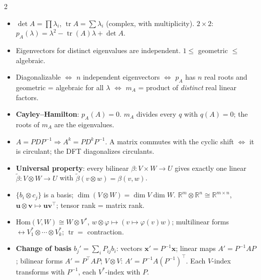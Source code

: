 \documentclass[10pt]{article}
\DeclareMathOperator{\tr}{tr}
\newcommand{\topic}[1]{\par\smallskip\noindent{\color{blue!50!black}\textbf{#1}}\par\nopagebreak}
\begin{document}
\begin{multicols}{2}
\topic{Eigenvalues}
\begin{itemize}
    \item $\det A = \prod\lambda_i$, $\tr A = \sum\lambda_i$ (complex, with multiplicity). $2 \times 2$: $p_A(\lambda) = \lambda^2 - \tr(A)\lambda + \det A$.
    \item Eigenvectors for distinct eigenvalues are independent. $1 \leq$ geometric $\leq$ algebraic.
    \item Diagonalizable $\iff$ $n$ independent eigenvectors $\iff$ $p_A$ has $n$ real roots and geometric = algebraic for all $\lambda$ $\iff$ $m_A$ = product of \emph{distinct} real linear factors.
    \item \textbf{Cayley--Hamilton}: $p_A(A) = 0$. $m_A$ divides every $q$ with $q(A) = 0$; the roots of $m_A$ are the eigenvalues.
    \item $A = PDP^{-1} \Rightarrow A^k = PD^kP^{-1}$. A matrix commutes with the cyclic shift $\iff$ it is circulant; the DFT diagonalizes circulants.
\end{itemize}

\topic{Tensors}
\begin{itemize}
    \item \textbf{Universal property}: every bilinear $\beta: V \times W \to U$ gives exactly one linear $\tilde\beta: V \otimes W \to U$ with $\tilde\beta(v \otimes w) = \beta(v, w)$.
    \item $\{b_i \otimes c_j\}$ is a basis; $\dim(V \otimes W) = \dim V\dim W$. $\mathbb{R}^m \otimes \mathbb{R}^n \cong \mathbb{R}^{m \times n}$, $\mathbf{u} \otimes \mathbf{v} \mapsto \mathbf{u}\mathbf{v}^\top$; tensor rank = matrix rank.
    \item $\mathrm{Hom}(V, W) \cong W \otimes V^*$, $w \otimes \varphi \mapsto (v \mapsto \varphi(v)w)$; multilinear forms $\leftrightarrow V_1^* \otimes \cdots \otimes V_k^*$; $\tr = $ contraction.
    \item \textbf{Change of basis} $b_j' = \sum_i P_{ij}b_i$: vectors $\mathbf{x}' = P^{-1}\mathbf{x}$; linear maps $A' = P^{-1}AP$; bilinear forms $A' = P^\top AP$; $V \otimes V$: $A' = P^{-1}A(P^{-1})^\top$. Each $V$-index transforms with $P^{-1}$, each $V^*$-index with $P$.
\end{itemize}


\end{multicols}
\end{document}
